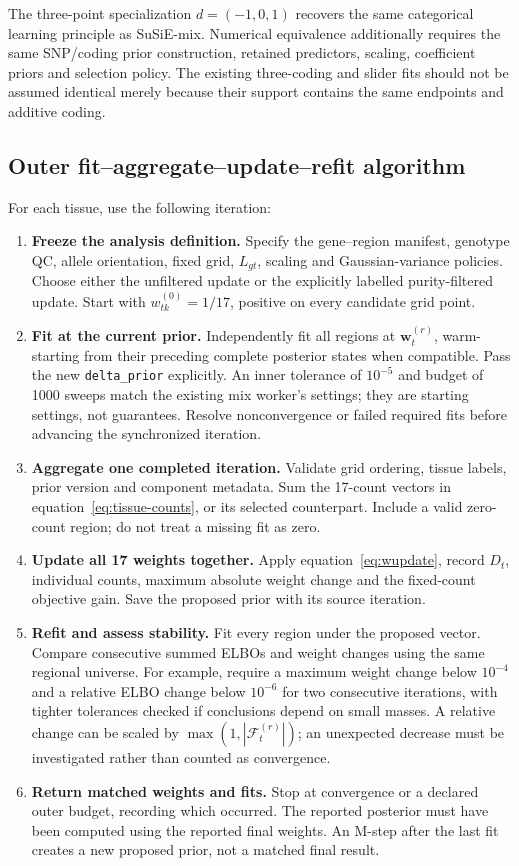 \documentclass[11pt]{article}
\begin{document}
The three-point specialization $d=(-1,0,1)$ recovers the same categorical
learning principle as SuSiE-mix. Numerical equivalence additionally requires
the same SNP/coding prior construction, retained predictors, scaling,
coefficient priors and selection policy. The existing three-coding and
slider fits should not be assumed identical merely because their support
contains the same endpoints and additive coding.

\subsection{Outer fit--aggregate--update--refit algorithm}
For each tissue, use the following iteration:
\begin{enumerate}
 \item \textbf{Freeze the analysis definition.} Specify the gene--region
 manifest, genotype QC, allele orientation, fixed grid, $L_{gt}$,
 scaling and Gaussian-variance policies. Choose either the unfiltered
 update or the explicitly labelled purity-filtered update.
 Start with $w_{tk}^{(0)}=1/17$, positive on every candidate grid point.
 \item \textbf{Fit at the current prior.} Independently fit all regions at
 $\mathbf w_t^{(r)}$, warm-starting from their preceding complete posterior
 states when compatible. Pass the new \texttt{delta\_prior} explicitly.
 An inner tolerance of $10^{-5}$ and budget of 1000 sweeps match the
 existing mix worker's settings; they are starting settings, not guarantees.
 Resolve nonconvergence or failed required fits before advancing the
 synchronized iteration.
 \item \textbf{Aggregate one completed iteration.} Validate grid ordering,
 tissue labels, prior version and component metadata. Sum the 17-count
 vectors in equation~\eqref{eq:tissue-counts}, or its selected counterpart.
 Include a valid zero-count region; do not treat a missing fit as zero.
 \item \textbf{Update all 17 weights together.} Apply
 equation~\eqref{eq:wupdate}, record $D_t$, individual counts,
 maximum absolute weight change and the fixed-count objective gain.
 Save the proposed prior with its source iteration.
 \item \textbf{Refit and assess stability.} Fit every region under the
 proposed vector. Compare consecutive summed ELBOs and weight changes
 using the same regional universe. For example, require a maximum weight
 change below $10^{-4}$ and a relative ELBO change below $10^{-6}$ for
 two consecutive iterations, with tighter tolerances checked if conclusions
 depend on small masses. A relative change can be scaled by
 $\max(1,|\mathcal F_t^{(r)}|)$; an unexpected decrease must be investigated
 rather than counted as convergence.
 \item \textbf{Return matched weights and fits.} Stop at convergence or a
 declared outer budget, recording which occurred. The reported posterior
 must have been computed using the reported final weights. An M-step after
 the last fit creates a new proposed prior, not a matched final result.
\end{enumerate}
\end{document}
